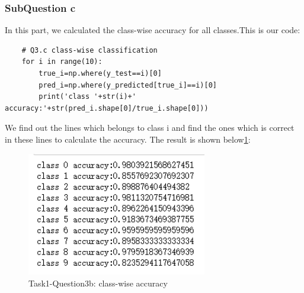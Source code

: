 \documentclass[conference]{IEEEtran}
\begin{document}
\subsubsection{SubQuestion c}
In this part, we calculated the class-wise accuracy for all classes.This is our code:
\begin{lstlisting}
    # Q3.c class-wise classification
    for i in range(10):
        true_i=np.where(y_test==i)[0]
        pred_i=np.where(y_predicted[true_i]==i)[0]
        print('class '+str(i)+' accuracy:'+str(pred_i.shape[0]/true_i.shape[0]))
\end{lstlisting}
We find out the lines which belongs to class i and find the ones which is correct in these lines to calculate the accuracy.
The result is shown below\ref{Fig.t1q3c}:
\begin{figure}[H] 
    \centering %
    \includegraphics[width=0.7\textwidth]{T1Q3c.png} %
    \caption{Task1-Question3b: class-wise accuracy} %
    \label{Fig.t1q3c} %
\end{figure}
\end{document}

